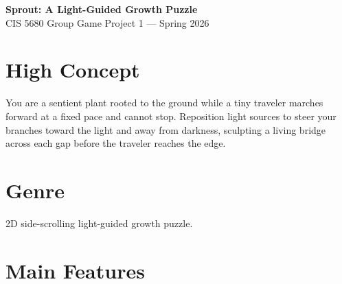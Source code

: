 \documentclass[11pt, letterpaper]{article}
\begin{document}
\begin{center}
    {\Large \textbf{Sprout: A Light-Guided Growth Puzzle}}\\[2pt]
    {\small CIS 5680 Group Game Project 1 --- Spring 2026}
\end{center}

\vspace{-4pt}

\section*{High Concept}

You are a sentient plant rooted to the ground while a tiny traveler marches forward at a fixed pace
and cannot stop. Reposition light sources to steer your branches toward the light and away from
darkness, sculpting a living bridge across each gap before the traveler reaches the edge.

\section*{Genre}

2D side-scrolling light-guided growth puzzle.

\section*{Main Features}
\end{document}
